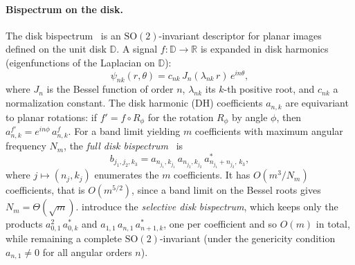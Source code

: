 \documentclass{article}
\theoremstyle{definition}
\theoremstyle{remark}
\newcommand{\R}{\mathbb{R}}
\newcommand{\SO}{\mathrm{SO}}
\theoremstyle{definition}
\begin{document}
\paragraph{Bispectrum on the disk.}
The disk bispectrum~\citep{zhao2014rotationally, myers2025selective}
is an $\SO(2)$-invariant descriptor for planar images defined on the
unit disk $\mathbb{D}$. A signal $f : \mathbb{D} \to \R$ is expanded in
disk harmonics (eigenfunctions of the Laplacian on $\mathbb{D}$):
\begin{equation}\label{eq:disk-harmonics}
  \psi_{nk}(r,\theta) = c_{nk}\, J_n(\lambda_{nk}\, r)\, e^{in\theta},
\end{equation}
where $J_n$ is the Bessel function of order $n$, $\lambda_{nk}$ its
$k$-th positive root, and $c_{nk}$ a normalization constant.
The disk harmonic (DH) coefficients $a_{n,k}$ are equivariant to planar
rotations: if $f' = f \circ R_\phi$ for the rotation $R_\phi$ by angle $\phi$, then
$a^{f'}_{n,k} = e^{in\phi}\, a^{f}_{n,k}$.
For a band limit yielding $m$ coefficients with maximum angular frequency
$N_m$, the \emph{full disk bispectrum}~\citep{zhao2014rotationally} is
\begin{equation}\label{eq:bispectrum-disk}
  b_{j_1,j_2,k_3}
  = a_{n_{j_1},k_{j_1}}\, a_{n_{j_2},k_{j_2}}\,
    a_{n_{j_1}+n_{j_2},\,k_3}^{*},
\end{equation}
where $j\mapsto(n_j,k_j)$ enumerates the $m$ coefficients. It has $O(m^3 / N_m)$
coefficients, that is $O(m^{5/2})$, since a band limit on the Bessel
roots gives $N_m = \Theta(\sqrt{m})$. \citet{myers2025selective} introduce
the \emph{selective disk bispectrum}, which keeps only the products
$a_{0,1}^2\, a_{0,k}^{*}$ and $a_{1,1}\, a_{n,1}\, a_{n+1,k}^{*}$, one per coefficient and
so $O(m)$ in total, while remaining a complete
$\SO(2)$-invariant (under the genericity condition $a_{n,1}\neq 0$ for
all angular orders $n$).
\end{document}
